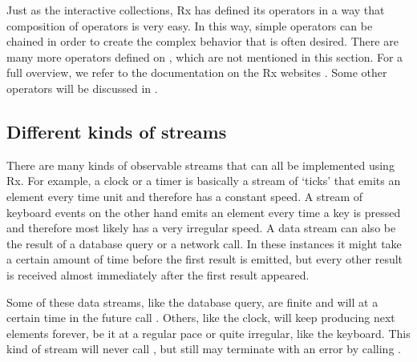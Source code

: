 Just as the interactive collections, Rx has defined its operators in a way that composition of operators is very easy. In this way, simple operators can be chained in order to create the complex behavior that is often desired. There are many more operators defined on \obs, which are not mentioned in this section. For a full overview, we refer to the documentation on the Rx websites . Some other operators will be discussed in . 

\subsection{Different kinds of streams}
There are many kinds of observable streams that can all be implemented using Rx. For example, a clock or a timer is basically a stream of `ticks' that emits an element every time unit and therefore has a constant speed. A stream of keyboard events on the other hand emits an element every time a key is pressed and therefore most likely has a very irregular speed. A data stream can also be the result of a database query or a network call. In these instances it might take a certain amount of time before the first result is emitted, but every other result is received almost immediately after the first result appeared.

Some of these data streams, like the database query, are finite and will at a certain time in the future call . Others, like the clock, will keep producing next elements forever, be it at a regular pace or quite irregular, like the keyboard. This kind of stream will never call , but still may terminate with an error by calling .


